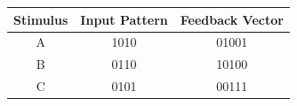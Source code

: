 \documentclass[preview,border=4pt]{standalone}
\begin{document}
\begin{tabular}{ccc}
\toprule
Stimulus & Input Pattern & Feedback Vector \\
\midrule
A & 1010 & 01001 \\
B & 0110 & 10100 \\
C & 0101 & 00111 \\
\bottomrule
\end{tabular}
\end{document}
